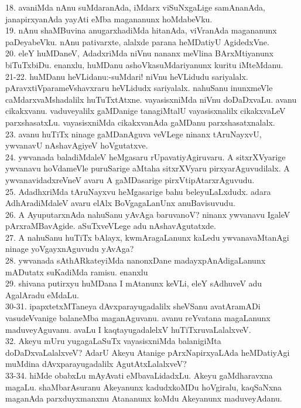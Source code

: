 \documentclass{article}
\begin{document}
18. avaniMda nAnu suMdaranAda, iMdarx viSuNxgaLige samAnanAda, janapirxyanAda yayAti eMba magananunx hoMdabeVku.\\
19. nAnu shaMBuvina anugarxhadiMda hitanAda, viVranAda magananunx paDeyabeVku. nAnu pativarxte, alalxde parana heMDatiyU AgidedxVne.\\
20. eleY huMDaneV, AdadxriMda niVnu nananx meVlina BArxMtiyanunx biTuTxbiDu. enanxlu, huMDanu ashoVkasuMdariyanunx kuritu iMteMdanu.\\
21-22. huMDanu heVLidanu:-suMdari! niVnu heVLidudu sariyalalx. pAravxtiVparameVshavxraru heVLidudx sariyalalx. nahuSanu inunxmeVle caMdarxvaMshadalilx huTuTxtAtxne. vayasisxniMda niVnu doDaDxvaLu. avanu cikakxvanu. vaduveyalilx gaMDanige tanagiMtalU vayasisxnalilx cikakxvaLeV parxshasatxLu. vayasisxniMda cikakxvanAda gaMDanu parxshasatxnalalx.\\
23. avanu huTiTx ninage gaMDanAguva veVLege ninanx tAruNayxvU, ywvanavU nAshavAgiyeV hoVgutatxve.\\
24. ywvanada baladiMdaleV heMgasaru rUpavatiyAgiruvaru. A sitxrXVyarige ywvanavu hoVdameVle puruSarige aMtaha sitxrXVyaru pirxyarAguvudilalx. A ywvanavidadxreVneV avaru A gaMDasarige pirxVtipAtarxrAguvudu.\\
25. AdadhxriMda tAruNayxvu heMgasarige bahu beleyuLaLxdudx. adara AdhAradiMdaleV avaru elAlx BoVgagaLanUnx anuBavisuvudu.\\
26. A AyuputarxnAda nahuSanu yAvAga baruvanoV? ninanx ywvanavu IgaleV pArxraMBavAgide. aSuTxveVLege adu nAshavAgutatxde.\\
27. A nahuSanu huTiTx bAlayx, kwmAragaLanunx kaLedu ywvanavaMtanAgi ninage yoVgayxnAguvudu yAvAga?\\
28. ywvanada sAthARkateyiMda nanonxDane madayxpAnAdigaLanunx mADutatx suKadiMda ramisu. enanxlu\\
29. shivana putirxyu huMDana I mAtanunx keVLi, eleY sAdhuveV adu AgalAradu eMdaLu.\\
30-31. ipapxtetxMTaneya dAvxparayugadalilx sheVSanu avatAramADi vasudeVvanige balaneMba maganAguvanu. avanu reYvatana magaLanunx maduveyAguvanu. avaLu I kaqtayugadalelxV huTiTxruvaLalalxveV.\\
32. Akeyu mUru yugagaLaSuTx vayasisxniMda balanigiMta doDaDxvaLalalxveV? AdarU Akeyu Atanige pArxNapirxyaLAda heMDatiyAgi muMdina dAvxparayugadalilx AgutAtxLalalxveV?\\
33-34. hiMde obabxLu mAyAvati eMbavaLidadxLu. Akeyu gaMdharavxna magaLu. shaMbarAsuranu Akeyanunx kadudxkoMDu hoVgiralu, kaqSaNxna maganAda parxduyxmanxnu Atananunx koMdu Akeyanunx maduveyAdanu.\\
\end{document}
